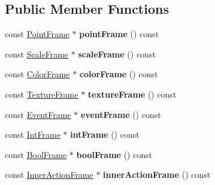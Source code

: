 \subsection*{Public Member Functions}
\begin{DoxyCompactItemize}
\item 
\mbox{\label{structflatbuffers_1_1Frame_a81b7731be9ac8a68cf2d9383fe7aeecd}} 
const \hyperlink{structflatbuffers_1_1PointFrame}{Point\+Frame} $\ast$ {\bfseries point\+Frame} () const
\item 
\mbox{\label{structflatbuffers_1_1Frame_a8ccb77522a12310708a61cc77964215d}} 
const \hyperlink{structflatbuffers_1_1ScaleFrame}{Scale\+Frame} $\ast$ {\bfseries scale\+Frame} () const
\item 
\mbox{\label{structflatbuffers_1_1Frame_a9996c804c343287fd50f7f7383259e15}} 
const \hyperlink{structflatbuffers_1_1ColorFrame}{Color\+Frame} $\ast$ {\bfseries color\+Frame} () const
\item 
\mbox{\label{structflatbuffers_1_1Frame_a71af560b43c78c4bebe696ae4a50f1c8}} 
const \hyperlink{structflatbuffers_1_1TextureFrame}{Texture\+Frame} $\ast$ {\bfseries texture\+Frame} () const
\item 
\mbox{\label{structflatbuffers_1_1Frame_a8cc6a468bc0c9e17e3be506d3a0ae105}} 
const \hyperlink{structflatbuffers_1_1EventFrame}{Event\+Frame} $\ast$ {\bfseries event\+Frame} () const
\item 
\mbox{\label{structflatbuffers_1_1Frame_a6bac49f5c264c5a96bd9330a6ff8d85c}} 
const \hyperlink{structflatbuffers_1_1IntFrame}{Int\+Frame} $\ast$ {\bfseries int\+Frame} () const
\item 
\mbox{\label{structflatbuffers_1_1Frame_a82c755858898313ec5b4880c02f2094c}} 
const \hyperlink{structflatbuffers_1_1BoolFrame}{Bool\+Frame} $\ast$ {\bfseries bool\+Frame} () const
\item 
\mbox{\label{structflatbuffers_1_1Frame_abf1f60a23416fdcb3f9396b7848e0f3e}} 
const \hyperlink{structflatbuffers_1_1InnerActionFrame}{Inner\+Action\+Frame} $\ast$ {\bfseries inner\+Action\+Frame} () const

\end{DoxyCompactItemize}
